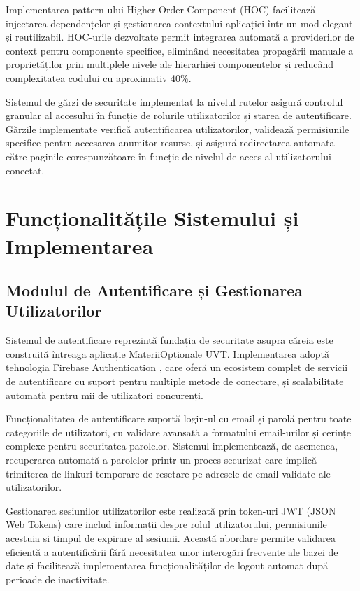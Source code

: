 \documentclass[12pt,a4paper]{report}
\begin{document}
Implementarea pattern-ului Higher-Order Component (HOC) facilitează injectarea dependențelor și gestionarea contextului aplicației într-un mod elegant și reutilizabil. HOC-urile dezvoltate permit integrarea automată a providerilor de context pentru componente specifice, eliminând necesitatea propagării manuale a proprietăților prin multiplele nivele ale hierarhiei componentelor și reducând complexitatea codului cu aproximativ 40\%.

Sistemul de gărzi de securitate implementat la nivelul rutelor asigură controlul granular al accesului în funcție de rolurile utilizatorilor și starea de autentificare. Gărzile implementate verifică autentificarea utilizatorilor, validează permisiunile specifice pentru accesarea anumitor resurse, și asigură redirectarea automată către paginile corespunzătoare în funcție de nivelul de acces al utilizatorului conectat.

\chapter{Funcționalitățile Sistemului și Implementarea}

\section{Modulul de Autentificare și Gestionarea Utilizatorilor}

Sistemul de autentificare reprezintă fundația de securitate asupra căreia este construită întreaga aplicație MateriiOptionale UVT. Implementarea adoptă tehnologia Firebase Authentication \cite{firebase-auth}, care oferă un ecosistem complet de servicii de autentificare cu suport pentru multiple metode de conectare, și scalabilitate automată pentru mii de utilizatori concurenți.

Funcționalitatea de autentificare suportă login-ul cu email și parolă pentru toate categoriile de utilizatori, cu validare avansată a formatului email-urilor și cerințe complexe pentru securitatea parolelor. Sistemul implementează, de asemenea, recuperarea automată a parolelor printr-un proces securizat care implică trimiterea de linkuri temporare de resetare pe adresele de email validate ale utilizatorilor.

Gestionarea sesiunilor utilizatorilor este realizată prin token-uri JWT (JSON Web Tokens) \cite{jwt-security} care includ informații despre rolul utilizatorului, permisiunile acestuia și timpul de expirare al sesiunii. Această abordare permite validarea eficientă a autentificării fără necesitatea unor interogări frecvente ale bazei de date și facilitează implementarea funcționalităților de logout automat după perioade de inactivitate.
\end{document}
